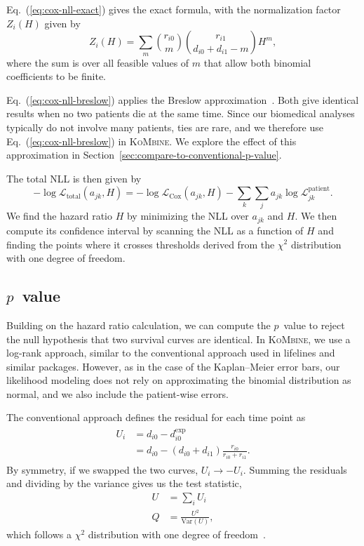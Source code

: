 \documentclass[pdflatex,sn-basic]{sn-jnl}%
\theoremstyle{thmstyleone}%
\theoremstyle{thmstyletwo}%
\theoremstyle{thmstylethree}%
\newcommand{\KM}{Kaplan--Meier} %
\newcommand{\KoMbine}{\textsc{KoMbine}}
\newcommand{\lifelines}{lifelines}
\begin{document}
Eq.~(\ref{eq:cox-nll-exact}) gives the exact formula, with the normalization factor \(Z_i(H)\) given by
\begin{equation}
Z_i(H) = \sum_{m}\binom{r_{i0}}{m}\binom{r_{i1}}{d_{i0}+d_{i1}-m}H^m,
\label{eq:cox-normalization}
\end{equation}
where the sum is over all feasible values of \(m\) that allow both binomial coefficients to be finite.

Eq.~(\ref{eq:cox-nll-breslow}) applies the Breslow approximation~\citep{breslow1974covariance}. Both give identical results when no two patients die at the same time. Since our biomedical analyses typically do not involve many patients, ties are rare, and we therefore use Eq.~(\ref{eq:cox-nll-breslow}) in \KoMbine{}. We explore the effect of this approximation in Section~\ref{sec:compare-to-conventional-p-value}.

The total NLL is then given by
\begin{equation}
-\log \mathcal{L}_{\text{total}}(a_{jk}, H) = -\log\mathcal{L}_{\text{Cox}}(a_{jk}, H) - \sum_{k}\sum_{j} a_{jk}\log \mathcal{L}_{jk}^{\text{patient}}.
\label{eq:hazard-ratio-nll}
\end{equation}
We find the hazard ratio \(H\) by minimizing the NLL over \(a_{jk}\) and \(H\). We then compute its confidence interval by scanning the NLL as a function of \(H\) and finding the points where it crosses thresholds derived from the \(\chi^2\) distribution with one degree of freedom.

\subsection[p value]{\(p\)~value}

Building on the hazard ratio calculation, we can compute the \(p\)~value to reject the null hypothesis that two survival curves are identical. In \KoMbine{}, we use a log-rank approach, similar to the conventional approach used in \lifelines{} and similar packages. However, as in the case of the \KM{} error bars, our likelihood modeling does not rely on approximating the binomial distribution as normal, and we also include the patient-wise errors.

The conventional approach defines the residual for each time point as
\begin{align}
\begin{aligned}
U_i&=d_{i0} - d_{i0}^\text{exp} \\
&=d_{i0} - (d_{i0} + d_{i1})\frac{r_{i0}}{r_{i0}+r_{i1}}.
\end{aligned}
\end{align}
By symmetry, if we swapped the two curves, \(U_i\rightarrow-U_i\). Summing the residuals and dividing by the variance gives us the test statistic,
\begin{align}
U&=\sum_i U_i \\
Q&=\frac{U^2}{\text{Var}(U)},
\end{align}
which follows a \(\chi^2\) distribution with one degree of freedom~\citep[pp.~45--47]{mantel1966evaluation,peto1972asymptotically,appliedsurvivalanalysis}.
\end{document}
